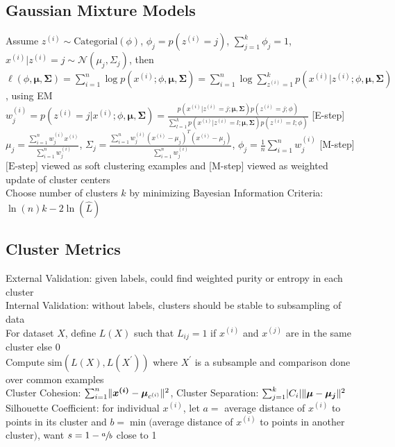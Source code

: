 \documentclass{article}
\DeclarePairedDelimiter\abs{\lvert}{\rvert}
\DeclarePairedDelimiter\norm{\lVert}{\rVert}
\begin{document}
\subsection{Gaussian Mixture Models}
Assume $z^{(i)} \sim \mbox{Categorial}(\phi)$, $\phi_j = p(z^{(i)} = j)$, $\sum_{j=1}^k \phi_j = 1$, $x^{(i)} | z^{(i)} = j \sim \mathcal{N}(\mu_j, \Sigma_j)$, then \\
$\ell(\phi, \boldsymbol \mu, \boldsymbol \Sigma) = \sum\limits_{i=1}^n \log p(x^{(i)}; \phi, \boldsymbol \mu, \boldsymbol \Sigma) = \sum\limits_{i=1}^n \log \sum\limits_{z^{(i)}=1}^k p(x^{(i)}| z^{(i)}; \phi, \boldsymbol \mu, \boldsymbol \Sigma)$, using EM \\
$w^{(i)}_j = p(z^{(i)}=j | x^{(i)}; \phi, \boldsymbol \mu, \boldsymbol \Sigma) = \frac{p(x^{(i)}|z^{(i)}=j; \boldsymbol \mu, \boldsymbol \Sigma)p(z^{(i)}=j ; \phi)}{\sum_{l=1}^k p(x^{(i)}|z^{(i)}=l; \boldsymbol \mu, \boldsymbol \Sigma)p(z^{(i)}=l ; \phi)}$ [E-step] \\
${\mu_j} = \frac{\sum_{i=1}^n w^{(i)}_jx^{(i)}}{\sum_{i=1}^n w^{(i)}_j}$, ${\Sigma_{j}} = \frac{\sum_{i=1}^nw^{(i)}_j (x^{(i)} - {\mu_j})^T(x^{(i)} - {\mu_j})}{\sum_{i=1}^nw^{(i)}_j}$, $\phi_j = \frac{1}{n}\sum\limits_{i=1}^n w^{(i)}_j$ [M-step] \\
$\mbox{[E-step]}$ viewed as soft clustering examples and [M-step] viewed as weighted update of cluster centers \\
Choose number of clusters $k$ by minimizing Bayesian Information Criteria: $\ln(n)k - 2\ln(\hat L)$ 

\subsection{Cluster Metrics}
External Validation: given labels, could find weighted purity or entropy in each cluster \\
Internal Validation: without labels, clusters should be stable to subsampling of data \\
For dataset $X$, define $L(X)$ such that $L_{ij} = 1$ if $x^{(i)}$ and $x^{(j)}$ are in the same cluster else $0$ \\
Compute $\mbox{sim}(L(X), L(X^\prime))$ where $X^\prime$ is a subsample and comparison done over common examples \\
Cluster Cohesion: $\sum_{i=1}^n \norm{\boldsymbol{x^{(i)}} - \boldsymbol \mu_{c^{(i)}}}^2$, Cluster Separation: $\sum_{j=1}^k \abs{C_i} \norm{\boldsymbol \mu - \boldsymbol{\mu_j}}^2$\\
Silhouette Coefficient: for individual $x^{(i)}$, let $a = $ average distance of $x^{(i)}$ to points in its cluster and $b = \min($average distance of $x^{(i)}$ to points in another cluster$)$, want $s = 1- \sfrac{a}{b}$ close to 1 
\end{document}
